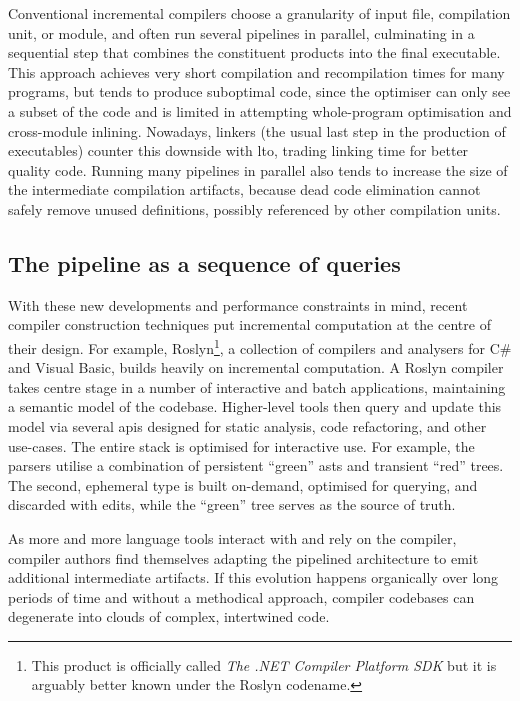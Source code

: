 Conventional incremental compilers choose a granularity of input file,
compilation unit, or module, and often run several pipelines in parallel,
culminating in a sequential step that combines the constituent products into the
final executable. This approach achieves very short compilation and
recompilation times for many programs, but tends to produce suboptimal code,
since the optimiser can only see a subset of the code and is limited in
attempting whole-program optimisation and cross-module inlining. Nowadays,
linkers (the usual last step in the production of executables) counter this
downside with \acrfull{lto}, trading linking time for better quality code.
Running many pipelines in parallel also tends to increase the size of the
intermediate compilation artifacts, because dead code elimination cannot safely
remove unused definitions, possibly referenced by other compilation units.

\subsection{The pipeline as a sequence of queries}

With these new developments and performance constraints in mind, recent compiler
construction techniques put incremental computation at the centre of their
design. For example, Roslyn\footnote{This product is officially called \emph{The
.NET Compiler Platform SDK} but it is arguably better known under the Roslyn
codename.}, a collection of compilers and analysers for C\# and Visual Basic,
builds heavily on incremental computation. A Roslyn compiler takes centre stage
in a number of interactive and batch applications, maintaining a semantic model
of the codebase. Higher-level tools then query and update this model via several
\acrshort{api}s designed for static analysis, code refactoring, and other
use-cases\cite{roslyn_apis}. The entire stack is optimised for interactive use. For example, the
parsers utilise a combination of persistent ``green'' \acrlong{ast}s and
transient ``red'' trees. The second, ephemeral type is built on-demand,
optimised for querying, and discarded with edits\cite{roslyn_red_green_trees},
while the ``green'' tree serves as the source of truth.

As more and more language tools interact with and rely on the compiler, compiler
authors find themselves adapting the pipelined architecture to emit additional
intermediate artifacts. If this evolution happens organically over long periods
of time and without a methodical approach, compiler codebases can degenerate
into clouds of complex, intertwined code.

